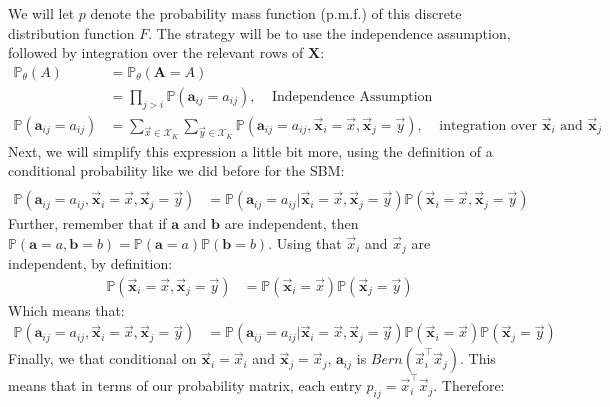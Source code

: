 \documentclass[letterpaper,10pt,english]{jupyterBook}
\begin{document}
\sphinxAtStartPar
We will let \(p\) denote the probability mass function (p.m.f.) of this discrete distribution function \(F\). The strategy will be to use the independence assumption, followed by integration over the relevant rows of \(\mathbf X\):
\begin{align*}
\mathbb P_\theta(A) &= \mathbb P_\theta(\mathbf A = A) \\
&= \prod_{j > i} \mathbb P(\mathbf a_{ij} = a_{ij}), \;\;\;\;\textrm{Independence Assumption} \\
\mathbb P(\mathbf a_{ij} = a_{ij})&= \sum_{\vec x \in \mathcal X_K}\sum_{\vec y \in \mathcal X_K}\mathbb P(\mathbf a_{ij} = a_{ij}, \vec{\mathbf x}_i = \vec x, \vec{\mathbf x}_j = \vec y),\;\;\;\;\textrm{integration over }\vec {\mathbf x}_i \textrm{ and }\vec {\mathbf x}_j
\end{align*}
\sphinxAtStartPar
Next, we will simplify this expression a little bit more, using the definition of a conditional probability like we did before for the SBM:
\begin{align*}
\\
\mathbb P(\mathbf a_{ij} = a_{ij}, \vec{\mathbf x}_i = \vec x, \vec{\mathbf x}_j = \vec y) &= \mathbb P(\mathbf a_{ij} = a_{ij}| \vec{\mathbf x}_i = \vec x, \vec{\mathbf x}_j = \vec y) \mathbb P(\vec{\mathbf x}_i = \vec x, \vec{\mathbf x}_j = \vec y)
\end{align*}
\sphinxAtStartPar
Further, remember that if \(\mathbf a\) and \(\mathbf b\) are independent, then \(\mathbb P(\mathbf a = a, \mathbf b = b) = \mathbb P(\mathbf a = a)\mathbb P(\mathbf b = b)\). Using that \(\vec x_i\) and \(\vec x_j\) are independent, by definition:
\begin{align*}
\mathbb P(\vec{\mathbf x}_i = \vec x, \vec{\mathbf x}_j = \vec y) &= \mathbb P(\vec{\mathbf x}_i = \vec x) \mathbb P(\vec{\mathbf x}_j = \vec y)
\end{align*}
\sphinxAtStartPar
Which means that:
\begin{align*}
\mathbb P(\mathbf a_{ij} = a_{ij}, \vec{\mathbf x}_i = \vec x, \vec{\mathbf x}_j = \vec y) &=  \mathbb P(\mathbf a_{ij} = a_{ij} | \vec{\mathbf x}_i = \vec x, \vec{\mathbf x}_j = \vec y)\mathbb P(\vec{\mathbf x}_i = \vec x) \mathbb P(\vec{\mathbf x}_j = \vec y)
\end{align*}
\sphinxAtStartPar
Finally, we that conditional on \(\vec{\mathbf x}_i = \vec x_i\) and \(\vec{\mathbf x}_j = \vec x_j\), \(\mathbf a_{ij}\) is \(Bern(\vec x_i^\top \vec x_j)\). This means that in terms of our probability matrix, each entry \(p_{ij} = \vec x_i^\top \vec x_j\). Therefore:
\end{document}
